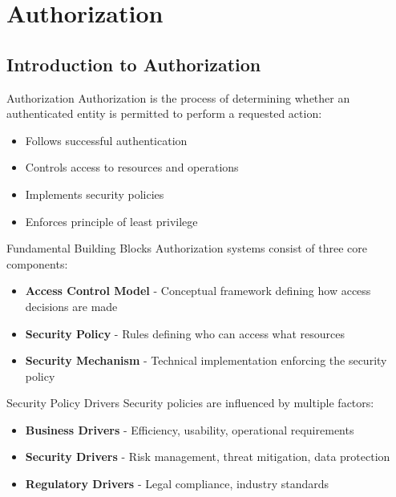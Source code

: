 \section{Authorization}

\subsection{Introduction to Authorization}

\begin{definition}{Authorization}
Authorization is the process of determining whether an authenticated entity is permitted to perform a requested action:
\begin{itemize}
    \item Follows successful authentication
    \item Controls access to resources and operations
    \item Implements security policies
    \item Enforces principle of least privilege
\end{itemize}
\end{definition}

\begin{concept}{Fundamental Building Blocks}
Authorization systems consist of three core components:
\begin{itemize}
    \item \textbf{Access Control Model} - Conceptual framework defining how access decisions are made
    \item \textbf{Security Policy} - Rules defining who can access what resources
    \item \textbf{Security Mechanism} - Technical implementation enforcing the security policy
\end{itemize}
\end{concept}

\begin{theorem}{Security Policy Drivers}
Security policies are influenced by multiple factors:
\begin{itemize}
    \item \textbf{Business Drivers} - Efficiency, usability, operational requirements
    \item \textbf{Security Drivers} - Risk management, threat mitigation, data protection
    \item \textbf{Regulatory Drivers} - Legal compliance, industry standards
\end{itemize}
\end{theorem}

